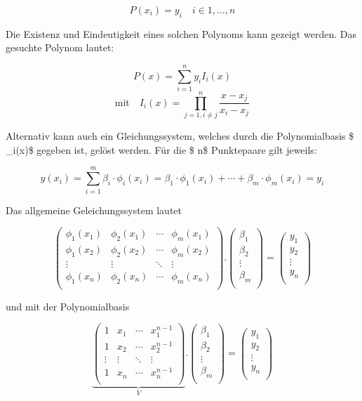 \documentclass[
  letterpaper,
  DIV=11,
  numbers=noendperiod]{scrreprt}
\begin{document}
\[  P(x_i) = y_i \quad i \in 1, \dots, n \]

Die Existenz und Eindeutigkeit eines solchen Polynoms kann gezeigt
werden. Das gesuchte Polynom lautet:

\[  P(x) = \sum_{i=1}^n y_i I_i(x) \]
\[  \text{mit}\quad I_i(x) = \prod_{j=1, i\neq j}^n \frac{x-x_j}{x_i - x_j} \]

Alternativ kann auch ein Gleichungssystem, welches durch die
Polynomialbasis \$ \phi\_i(x)\$ gegeben ist, gelöst werden. Für die \$
n\$ Punktepaare gilt jeweils:

\[  y(x_i) = \sum_{i=1}^{m}\beta_i \cdot \phi_i(x_i) = \beta_1\cdot \phi_1(x_i) + \cdots + \beta_m\cdot \phi_m(x_i) = y_i \]

Das allgemeine Geleichungssystem lautet

\[  \left( \begin{matrix} \phi_1(x_1) & \phi_2(x_1) & \cdots & \phi_m(x_1) \\ 
             \phi_1(x_2) & \phi_2(x_2) & \cdots & \phi_m(x_2) \\ 
             \vdots &\vdots & \ddots & \vdots \\ 
             \phi_1(x_n) & \phi_2(x_n) & \cdots & \phi_m(x_n) \\ 
             \end{matrix}\right). 
\left(  \begin{matrix} \beta_1 \\  
      \beta_2 \\   \vdots \\   \beta_m \\ 
      \end{matrix} \right) 
= \left(  \begin{matrix} y_1 \\  y_2 \\   \vdots \\   y_n \\ \end{matrix} \right) \]

und mit der Polynomialbasis

\[ \underbrace{\left( \begin{matrix} 1 & x_1 & \cdots & x_1^{n-1} \\ 1 & x_2 & \cdots & x_2^{n-1} \\ \vdots &\vdots & \ddots & \vdots \\ 1 & x_n & \cdots & x_n^{n-1} \\ \end{matrix}\right)}_{V}. \left(  \begin{matrix} \beta_1 \\  \beta_2 \\   \vdots \\   \beta_m \\ \end{matrix} \right) = \left(  \begin{matrix} y_1 \\  y_2 \\   \vdots \\   y_n \\ \end{matrix} \right)\]
\end{document}

